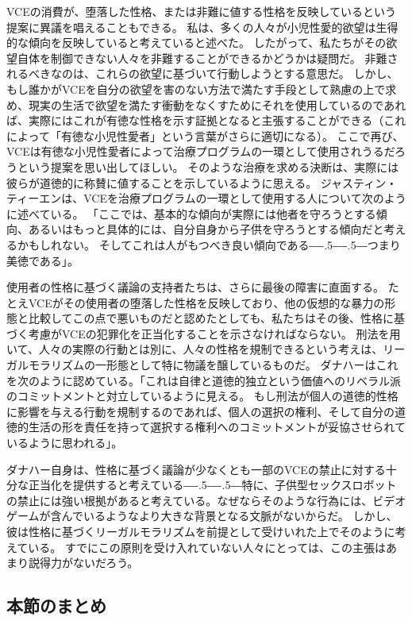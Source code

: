 \documentclass[paper=a4,book,openany]{jlreq}
\def\DDASH{―\kern-.5\zw―\kern-.5\zw―} %
\begin{document}
VCEの消費が、堕落した性格、または非難に値する性格を反映しているという提案に異議を唱えることもできる。
私は、多くの人々が小児性愛的欲望は生得的な傾向を反映していると考えていると述べた。
したがって、私たちがその欲望自体を制御できない人々を非難することができるかどうかは疑問だ。
非難されるべきなのは、これらの欲望に基づいて行動しようとする意思だ。
しかし、もし誰かがVCEを自分の欲望を害のない方法で満たす手段として熟慮の上で求め、現実の生活で欲望を満たす衝動をなくすためにそれを使用しているのであれば、実際にはこれが有徳な性格を示す証拠となると主張することができる（これによって「有徳な小児性愛者」という言葉がさらに適切になる）。
ここで再び、VCEは有徳な小児性愛者によって治療プログラムの一環として使用されうるだろうという提案を思い出してほしい。
そのような治療を求める決断は、実際には彼らが道徳的に称賛に値することを示しているように思える。
ジャスティン・ティーエンは、VCEを治療プログラムの一環として使用する人について次のように述べている。
「ここでは、基本的な傾向が実際には他者を守ろうとする傾向、あるいはもっと具体的には、自分自身から子供を守ろうとする傾向だと考えるかもしれない。
そしてこれは人がもつべき良い傾向である{\DDASH}つまり美徳である」\citep[p.1159]{tiehen18:_virtual_ethic_creep_act}。

使用者の性格に基づく議論の支持者たちは、さらに最後の障害に直面する。
たとえVCEがその使用者の堕落した性格を反映しており、他の仮想的な暴力の形態と比較してこの点で悪いものだと認めたとしても、私たちはその後、性格に基づく考慮がVCEの犯罪化を正当化することを示さなければならない。
刑法を用いて、人々の実際の行動とは別に、人々の性格を規制できるという考えは、リーガルモラリズムの一形態として特に物議を醸しているものだ。
ダナハーはこれを次のように認めている。「これは自律と道徳的独立という価値へのリベラル派のコミットメントと対立しているように見える。
もし刑法が個人の道徳的性格に影響を与える行動を規制するのであれば、個人の選択の権利、そして自分の道徳的生活の形を責任を持って選択する権利へのコミットメントが妥協させられているように思われる」\citep[p.79]{danaher17:_robot_rape_robot_child_sexual_abuse}。

ダナハー自身は、性格に基づく議論が少なくとも一部のVCEの禁止に対する十分な正当化を提供すると考えている{\DDASH}特に、子供型セックスロボットの禁止には強い根拠があると考えている。なぜならそのような行為には、ビデオゲームが含んでいるようなより大きな背景となる文脈がないからだ。
しかし、彼は性格に基づくリーガルモラリズムを前提として受けいれた上でそのように考えている。
すでにこの原則を受け入れていない人々にとっては、この主張はあまり説得力がないだろう。

\subsection{本節のまとめ}
\end{document}
